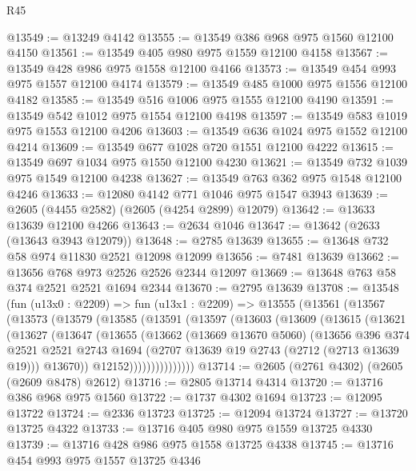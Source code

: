 \begin{lexlean}{R45}
\begin{coremodule}
@13549 := @13249 @4142
@13555 := @13549 @386 @968 @975 @1560 @12100 @4150
@13561 := @13549 @405 @980 @975 @1559 @12100 @4158
@13567 := @13549 @428 @986 @975 @1558 @12100 @4166
@13573 := @13549 @454 @993 @975 @1557 @12100 @4174
@13579 := @13549 @485 @1000 @975 @1556 @12100 @4182
@13585 := @13549 @516 @1006 @975 @1555 @12100 @4190
@13591 := @13549 @542 @1012 @975 @1554 @12100 @4198
@13597 := @13549 @583 @1019 @975 @1553 @12100 @4206
@13603 := @13549 @636 @1024 @975 @1552 @12100 @4214
@13609 := @13549 @677 @1028 @720 @1551 @12100 @4222
@13615 := @13549 @697 @1034 @975 @1550 @12100 @4230
@13621 := @13549 @732 @1039 @975 @1549 @12100 @4238
@13627 := @13549 @763 @362 @975 @1548 @12100 @4246
@13633 := @12080 @4142 @771 @1046 @975 @1547 @3943
@13639 := @2605 (@4455 @2582) (@2605 (@4254 @2899) @12079)
@13642 := @13633 @13639 @12100 @4266
@13643 := @2634 @1046
@13647 := @13642 (@2633 (@13643 @3943 @12079))
@13648 := @2785 @13639
@13655 := @13648 @732 @58 @974 @11830 @2521 @12098 @12099
@13656 := @7481 @13639
@13662 := @13656 @768 @973 @2526 @2526 @2344 @12097
@13669 := @13648 @763 @58 @374 @2521 @2521 @1694 @2344
@13670 := @2795 @13639
@13708 := @13548
    (fun (u13x0 : @2209) =>
    fun (u13x1 : @2209) =>
    @13555
      (@13561
        (@13567
          (@13573
            (@13579
              (@13585
                (@13591
                  (@13597
                    (@13603
                      (@13609
                        (@13615
                          (@13621
                            (@13627
                              (@13647
                                (@13655
                                  (@13662
                                    (@13669 @13670 @5060)
                                    (@13656
                                      @396
                                      @374
                                      @2521
                                      @2521
                                      @2743
                                      @1694
                                      (@2707 @13639 @19 @2743 (@2712 (@2713 @13639 @19)))
                                      @13670))
                                  @12152)))))))))))))))
@13714 := @2605 (@2761 @4302) (@2605 (@2609 @8478) @2612)
@13716 := @2805 @13714 @4314
@13720 := @13716 @386 @968 @975 @1560
@13722 := @1737 @4302 @1694
@13723 := @12095 @13722
@13724 := @2336 @13723
@13725 := @12094 @13724
@13727 := @13720 @13725 @4322
@13733 := @13716 @405 @980 @975 @1559 @13725 @4330
@13739 := @13716 @428 @986 @975 @1558 @13725 @4338
@13745 := @13716 @454 @993 @975 @1557 @13725 @4346

\end{coremodule}
\end{lexlean}
